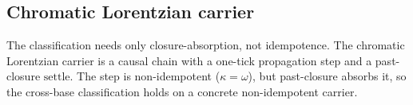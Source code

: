 \subsection{Chromatic Lorentzian carrier}

\begin{theorem}\label{thm:chromatic-lorentzian-carrier}\leanok{}
The classification needs only closure-absorption, not idempotence.  The
chromatic Lorentzian carrier is a causal chain with a one-tick propagation step
and a past-closure \(\mathrm{settle}\).  The step is non-idempotent
(\(\kappa=\omega\)), but past-closure absorbs it, so the cross-base
classification holds on a concrete non-idempotent carrier.
\end{theorem}
